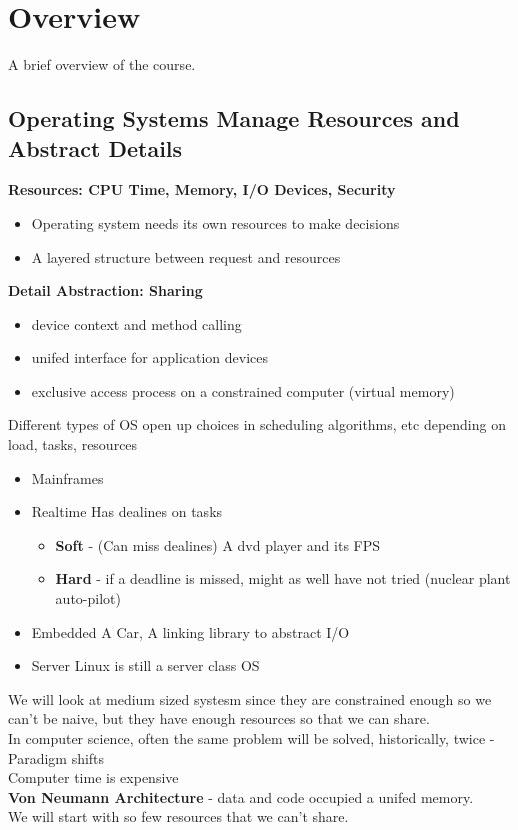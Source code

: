 \documentclass[../base_file/cs1550_notes.tex]{subfiles}
\begin{document}
\chapter{Overview}
A brief overview of the course.
\section{Operating Systems Manage Resources and Abstract Details}
\textbf{Resources: CPU Time, Memory, I/O Devices, Security}
	\begin{itemize}
	\item Operating system needs its own resources to make decisions
	\item A layered structure between request and resources
	\end{itemize}
\textbf{Detail Abstraction: Sharing}
	\begin{itemize}
	\item device context and method calling
	\item unifed interface for application devices
	\item exclusive access  process on a constrained computer (virtual memory)
	\end{itemize}
Different types of OS open up choices in scheduling algorithms, etc depending on load, tasks, resources
	\begin{itemize}
	\item Mainframes
	\item Realtime \- Has dealines on tasks
		\begin{itemize}
		\item \textbf{Soft} - (Can miss dealines) A dvd player and its FPS
		\item \textbf{Hard} - if a deadline is missed, might as well have not tried (nuclear plant auto-pilot)
		\end{itemize}
	\item Embedded \- A Car, A linking library to abstract I/O
	\item Server \- Linux is still a server class OS
	\end{itemize}
We will look at medium sized systesm since they are constrained enough so we can't be naive, but they have enough resources so that we can share.\\
In computer science, often the same problem will be solved, historically, twice - Paradigm shifts\\
Computer time is expensive\\
\textbf{Von Neumann Architecture} - data and code occupied a unifed memory.\\
We will start with so few resources that we can't share.
\end{document}

